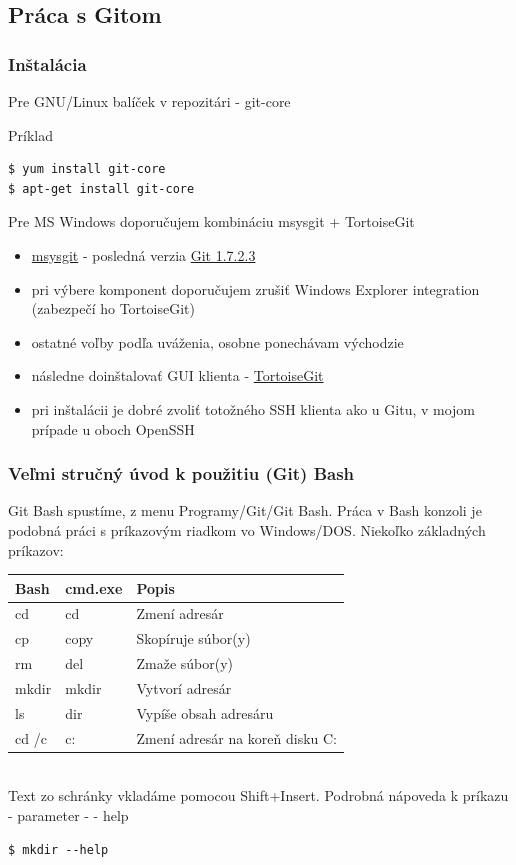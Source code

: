 \documentclass[red]{beamer}
\begin{document}
\subsection{Práca s Gitom}

\begin{frame}[fragile]
\frametitle{Inštalácia}   

Pre GNU/Linux  balíček v repozitári - git-core
\begin{block}{Príklad}
\begin{verbatim}
$ yum install git-core		
$ apt-get install git-core		
\end{verbatim}
\end{block}
Pre MS Windows doporučujem kombináciu msysgit + TortoiseGit
\begin{itemize}
\item \href{http://code.google.com/p/msysgit/}{msysgit} - posledná verzia \href{ http://code.google.com/p/msysgit/downloads/detail?name=Git-1.7.2.3-preview20100911.exe}{Git 1.7.2.3}
\item pri výbere komponent doporučujem zrušiť Windows Explorer integration (zabezpečí ho TortoiseGit)
\item ostatné voľby podľa uváženia, osobne ponechávam východzie
\item následne doinštalovať GUI klienta - \href{ http://code.google.com/p/tortoisegit/}{TortoiseGit}
\item pri inštalácii je dobré zvoliť totožného SSH klienta ako u Gitu, v mojom prípade u oboch OpenSSH
 \end{itemize}
\end{frame}

\begin{frame}[fragile]
\frametitle{Veľmi stručný úvod k použitiu (Git) Bash}   
Git Bash spustíme, z menu Programy/Git/Git Bash. Práca v Bash konzoli je podobná práci s príkazovým riadkom vo Windows/DOS. 
Niekoľko základných príkazov:
\\
\begin{tabular}{|l||l|l|}

\hline
  {\bf Bash} & {\bf cmd.exe} &  {\bf Popis} \\
\hline
\hline
  cd & cd   &  Zmení adresár  \\
  cp & copy  & Skopíruje súbor(y) \\
  rm & del  & Zmaže súbor(y) \\
  mkdir & mkdir & Vytvorí adresár \\
  ls & dir & Vypíše obsah adresáru \\
  cd /c & c: & Zmení adresár na koreň disku C: \\
\hline
\end{tabular}
\\ 
Text zo schránky vkladáme pomocou Shift+Insert.
Podrobná nápoveda k príkazu - parameter - - help
\begin{block}{}
\begin{verbatim}
$ mkdir --help	
\end{verbatim}
\end{block}
\end{frame}
\end{document}
